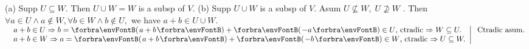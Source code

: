 (a) Supp $U\subseteq W$. Then $U\cup W=W$ is a subsp of $V$.\parSol{}
(b) Supp $U\cup W$ is a subsp of $V$. Asum $U\not\subseteq W,\;U\not\supseteq W$ .\parSol{\Hb}
Then $\forall a\in U\wedge a\not\in W,\forall b\in W\wedge b\not\in U,$ we have $a+b\in U\cup W$.\parSol{\vspace{2pt}\Hb}
\!\!\!$\MathRightMid{l}{$
$a+b\in U\Rightarrow b=\Par{a+b}+\Par{{-a}}\in U$, ctradic $\Rightarrow W\subseteq U.\\ $
$a+b\in W\Rightarrow a=\Par{a+b}+\Par{{-b}}\in W$, ctradic $\Rightarrow U\subseteq W.}\hText{$
Ctradic asum.$\\\;}$\PfEnd[-14pt]
\SepLine\pagebreak

